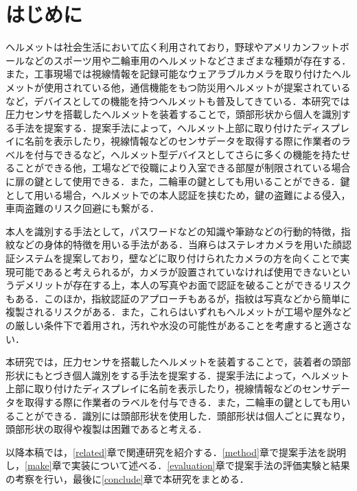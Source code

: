 \documentclass[Japanese,noauthor]{dicomopapers}
\begin{document}
\section{はじめに}
\label{introduction}
ヘルメットは社会生活において広く利用されており，野球やアメリカンフットボールなどのスポーツ用や二輪車用のヘルメットなどさまざまな種類が存在する．また，工事現場では視線情報を記録可能なウェアラブルカメラを取り付けたヘルメットが使用されている他，通信機能をもつ防災用ヘルメット\cite{disaster}が提案されているなど，デバイスとしての機能を持つヘルメットも普及してきている．本研究では圧力センサを搭載したヘルメットを装着することで，頭部形状から個人を識別する手法を提案する．提案手法によって，ヘルメット上部に取り付けたディスプレイに名前を表示したり，視線情報などのセンサデータを取得する際に作業者のラベルを付与できるなど，ヘルメット型デバイスとしてさらに多くの機能を持たせることができる他，工場などで役職により入室できる部屋が制限されている場合に扉の鍵として使用できる．また，二輪車の鍵としても用いることができる．鍵として用いる場合，ヘルメットでの本人認証を挟むため，鍵の盗難による侵入，車両盗難のリスク回避にも繋がる．\par

本人を識別する手法として，パスワードなどの知識や筆跡などの行動的特徴，指紋などの身体的特徴を用いる手法がある．当麻ら\cite{face}はステレオカメラを用いた顔認証システムを提案しており，壁などに取り付けられたカメラの方を向くことで実現可能であると考えられるが，カメラが設置されていなければ使用できないというデメリットが存在する上，本人の写真やお面で認証を破ることができるリスクもある．このほか，指紋認証のアプローチもあるが，指紋は写真などから簡単に複製されるリスク\cite{finger_print}がある．また，これらはいずれもヘルメットが工場や屋外などの厳しい条件下で着用され，汚れや水没の可能性があることを考慮すると適さない．\par

本研究では，圧力センサを搭載したヘルメットを装着することで，装着者の頭部形状にもとづき個人識別をする手法を提案する．提案手法によって，ヘルメット上部に取り付けたディスプレイに名前を表示したり，視線情報などのセンサデータを取得する際に作業者のラベルを付与できる．また，二輪車の鍵としても用いることができる．識別には頭部形状を使用した．頭部形状は個人ごとに異なり，頭部形状の取得や複製は困難であると考える．\par

以降本稿では，\ref{related}章で関連研究を紹介する．\ref{method}章で提案手法を説明し，\ref{make}章で実装について述べる．\ref{evaluation}章で提案手法の評価実験と結果の考察を行い，最後に\ref{conclude}章で本研究をまとめる．
\end{document}
